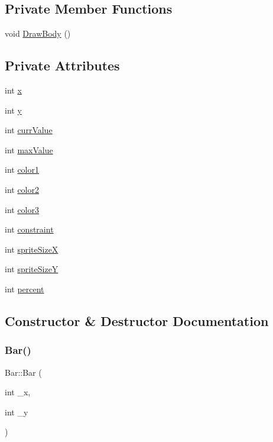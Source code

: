 \subsection*{Private Member Functions}
\begin{DoxyCompactItemize}
\item 
void \hyperlink{class_bar_aeeee51e9cd348b8d047d8471b6cd4a4f}{Draw\+Body} ()
\end{DoxyCompactItemize}
\subsection*{Private Attributes}
\begin{DoxyCompactItemize}
\item 
int \hyperlink{class_bar_afec956dd7e6968d868526e11719ecc84}{x}
\item 
int \hyperlink{class_bar_a615196fa4038f45dba32ad9a8dcaed97}{y}
\item 
int \hyperlink{class_bar_a0b24fa3bd9ce6e981c5fe4f40ddee6c8}{curr\+Value}
\item 
int \hyperlink{class_bar_a17c67d8e82b025ff7a5fb5dc1ec374ac}{max\+Value}
\item 
int \hyperlink{class_bar_afb0e85e1fad2eaf310e9fc1338871471}{color1}
\item 
int \hyperlink{class_bar_a3dbe1d89800fce32da2fd0e11a61df8f}{color2}
\item 
int \hyperlink{class_bar_a73d218fdbec336cb531b2fbde3e2824c}{color3}
\item 
int \hyperlink{class_bar_a182e0031320627545517f6e2a4b5ff45}{constraint}
\item 
int \hyperlink{class_bar_a8677658d9ee2351c161ed26bd945852c}{sprite\+SizeX}
\item 
int \hyperlink{class_bar_a426e237be6cad612c8b12b67443cbc26}{sprite\+SizeY}
\item 
int \hyperlink{class_bar_a4f5c489ca084c5634bbe671067f0f19d}{percent}
\end{DoxyCompactItemize}


\subsection{Constructor \& Destructor Documentation}
\mbox{\label{class_bar_aa9f14363103e806a03386e4ca1c6059c}} 
\subsubsection{\texorpdfstring{Bar()}{Bar()}}
{\footnotesize\ttfamily Bar\+::\+Bar (\begin{DoxyParamCaption}\item[{int}]{\+\_\+x,  }\item[{int}]{\+\_\+y }\end{DoxyParamCaption})}

